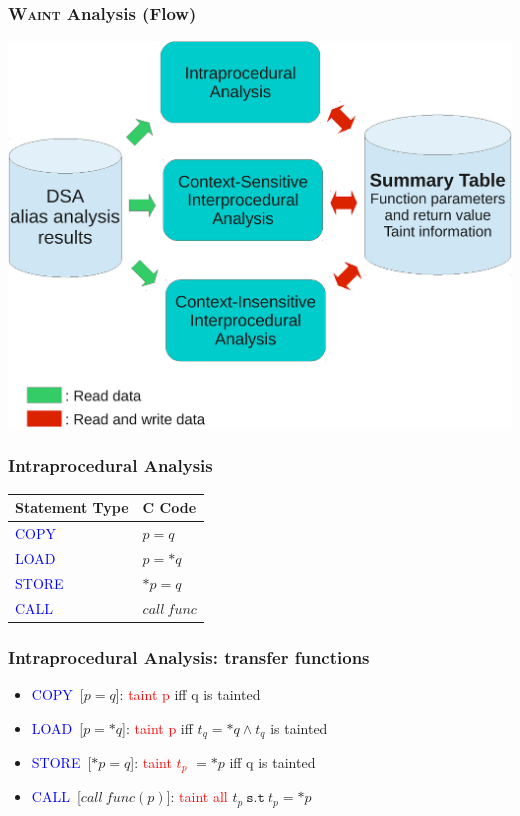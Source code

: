 \documentclass[xcolor=dvipsnames]{beamer}
\newcommand{\waint}{\textsc{Waint}\xspace}
\begin{document}
\begin{frame}
  \frametitle{\waint Analysis (Flow)} 
	{\small
	\begin{center}
	\includegraphics[scale=0.4]{analysisFlow}
	\end{center}  	
}
\end{frame}

\begin{frame}
  \frametitle{Intraprocedural Analysis} 
	\Large
\begin{center}
\begin{tabular}{|l|l|}
\hline
Statement Type 				& C Code 			\\ \hline
\hline
\textcolor{blue}{COPY}		& $p = q$				\\	\hline
\textcolor{blue}{LOAD}		& $p = *q$				\\ 	\hline
\textcolor{blue}{STORE}		& $*p = q$				\\ 	\hline
\textcolor{blue}{CALL}		& $\mathit{call\ func}  $ \\ 	\hline
\end{tabular}
\end{center}    	
\end{frame}

\begin{frame}
  \frametitle{Intraprocedural Analysis: transfer functions} 
	{\large
	\begin{itemize}
	\item \textcolor{blue}{COPY}\ [$p = q$]: \textcolor{red}{taint p} iff q is tainted
   	\vspace{0.2cm}	
	\item \textcolor{blue}{LOAD}\ [$p = *q$]: \textcolor{red}{taint p} iff $t_q = *q \wedge t_q$ is tainted
   	\vspace{0.2cm}		
	\item \textcolor{blue}{STORE}\ [$*p = q$]: \textcolor{red}{taint $t_p$} $= *p$ iff q is tainted
   	\vspace{0.2cm}				
	\item \textcolor{blue}{CALL}\	 [$\mathit{call\ func(p)}$]: \textcolor{red}{taint all} $t_p\ \mathtt{s.t}\ t_p = *p$ 
	\end{itemize}
}
\end{frame}
\end{document}
